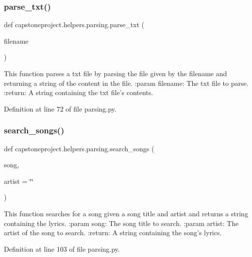 \subsubsection{\texorpdfstring{parse\+\_\+txt()}{parse\_txt()}}
{\footnotesize\ttfamily def capstoneproject.\+helpers.\+parsing.\+parse\+\_\+txt (\begin{DoxyParamCaption}\item[{}]{filename }\end{DoxyParamCaption})}

\begin{DoxyVerb}This function parses a txt file by parsing the file given by the filename and returning a string of the content
in the file.
:param filename: The txt file to parse.
:return: A string containing the txt file's contents.
\end{DoxyVerb}
 

Definition at line 72 of file parsing.\+py.

\mbox{\label{namespacecapstoneproject_1_1helpers_1_1parsing_ab61dc07445d1ead2bf985aa1ddcadc7c}} 
\subsubsection{\texorpdfstring{search\+\_\+songs()}{search\_songs()}}
{\footnotesize\ttfamily def capstoneproject.\+helpers.\+parsing.\+search\+\_\+songs (\begin{DoxyParamCaption}\item[{}]{song,  }\item[{}]{artist = {\ttfamily \char`\"{}\char`\"{}} }\end{DoxyParamCaption})}

\begin{DoxyVerb}This function searches for a song given a song title and artist and returns a string containing the lyrics.
:param song: The song title to search.
:param artist: The artist of the song to search.
:return: A string containing the song's lyrics.
\end{DoxyVerb}
 

Definition at line 103 of file parsing.\+py.

\mbox{\label{namespacecapstoneproject_1_1helpers_1_1parsing_a6b677a3dfd33e29cc5e4049f9a174062}} 
